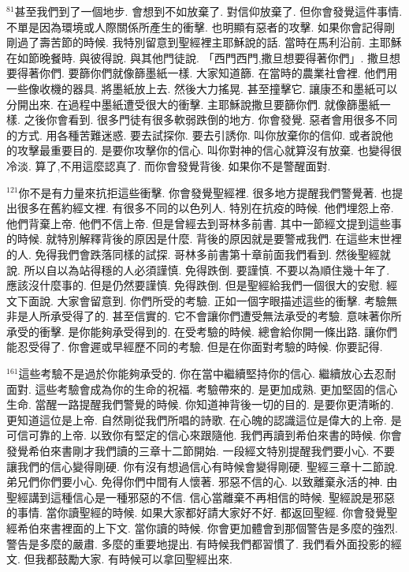 \documentclass{book}
\begin{document}
$^{81}$甚至我們到了一個地步.
會想到不如放棄了.
對信仰放棄了.
但你會發覺這件事情.
不單是因為環境或人際關係所產生的衝擊.
也明顯有惡者的攻擊.
如果你會記得剛剛過了壽苦節的時候.
我特別留意到聖經裡主耶穌說的話.
當時在馬利沿前.
主耶穌在如節晚餐時.
與彼得說.
與其他門徒說.
「西門西門,撒旦想要得著你們」.
撒旦想要得著你們.
要篩你們就像篩墨紙一樣.
大家知道篩.
在當時的農業社會裡.
他們用一些像收機的器具.
將墨紙放上去.
然後大力搖晃.
甚至撞擊它.
讓康丕和墨紙可以分開出來.
在過程中墨紙遭受很大的衝擊.
主耶穌說撒旦要篩你們.
就像篩墨紙一樣.
之後你會看到.
很多門徒有很多軟弱跌倒的地方.
你會發覺.
惡者會用很多不同的方式.
用各種苦難迷惑.
要去試探你.
要去引誘你.
叫你放棄你的信仰.
或者說他的攻擊最重要目的.
是要你攻擊你的信心.
叫你對神的信心就算沒有放棄.
也變得很冷淡.
算了,不用這麼認真了.
而你會發覺背後.
如果你不是警醒面對.

$^{121}$你不是有力量來抗拒這些衝擊.
你會發覺聖經裡.
很多地方提醒我們警覺著.
也提出很多在舊約經文裡.
有很多不同的以色列人.
特別在抗疫的時候.
他們埋怨上帝.
他們背棄上帝.
他們不信上帝.
但是曾經去到哥林多前書.
其中一節經文提到這些事的時候.
就特別解釋背後的原因是什麼.
背後的原因就是要警戒我們.
在這些末世裡的人.
免得我們會跌落同樣的試探.
哥林多前書第十章前面我們看到.
然後聖經就說.
所以自以為站得穩的人必須謹慎.
免得跌倒.
要謹慎.
不要以為順住幾十年了.
應該沒什麼事的.
但是仍然要謹慎.
免得跌倒.
但是聖經給我們一個很大的安慰.
經文下面說.
大家會留意到.
你們所受的考驗.
正如一個字眼描述這些的衝擊.
考驗無非是人所承受得了的.
甚至信實的.
它不會讓你們遭受無法承受的考驗.
意味著你所承受的衝擊.
是你能夠承受得到的.
在受考驗的時候.
總會給你開一條出路.
讓你們能忍受得了.
你會遲或早經歷不同的考驗.
但是在你面對考驗的時候.
你要記得.

$^{161}$這些考驗不是過於你能夠承受的.
你在當中繼續堅持你的信心.
繼續放心去忍耐面對.
這些考驗會成為你的生命的祝福.
考驗帶來的.
是更加成熟.
更加堅固的信心生命.
當醒一路提醒我們警覺的時候.
你知道神背後一切的目的.
是要你更清晰的.
更知道這位是上帝.
自然剛從我們所唱的詩歌.
在心魄的認識這位是偉大的上帝.
是可信可靠的上帝.
以致你有堅定的信心來跟隨他.
我們再讀到希伯來書的時候.
你會發覺希伯來書剛才我們讀的三章十二節開始.
一段經文特別提醒我們要小心.
不要讓我們的信心變得剛硬.
你有沒有想過信心有時候會變得剛硬.
聖經三章十二節說.
弟兄們你們要小心.
免得你們中間有人懷著.
邪惡不信的心.
以致離棄永活的神.
由聖經講到這種信心是一種邪惡的不信.
信心當離棄不再相信的時候.
聖經說是邪惡的事情.
當你讀聖經的時候.
如果大家都好請大家好不好.
都返回聖經.
你會發覺聖經希伯來書裡面的上下文.
當你讀的時候.
你會更加體會到那個警告是多麼的強烈.
警告是多麼的嚴肅.
多麼的重要地提出.
有時候我們都習慣了.
我們看外面投影的經文.
但我都鼓勵大家.
有時候可以拿回聖經出來.
\end{document}
